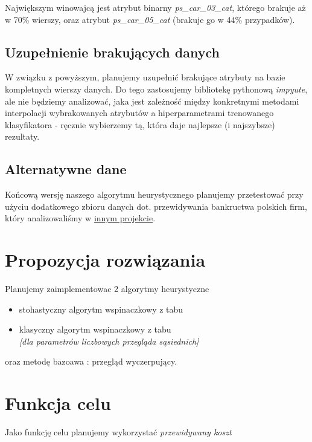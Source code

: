 \documentclass[11pt]{article}
\begin{document}
Największym winowajcą jest atrybut binarny \textsl{ps\_car\_03\_cat}, którego brakuje aż w 70\% wierszy, oraz atrybut \textsl{ps\_car\_05\_cat} (brakuje go w 44\% przypadków).

\subsection{Uzupełnienie brakujących danych}
W związku z powyższym, planujemy uzupełnić brakujące atrybuty na bazie kompletnych wierszy danych. Do tego zastosujemy bibliotekę pythonową \textsl{impyute}, ale nie będziemy analizować, jaka jest zależność między konkretnymi metodami interpolacji wybrakowanych atrybutów a hiperparametrami trenowanego klasyfikatora - ręcznie wybierzemy tą, która daje najlepsze (i najszybsze) rezultaty.

\subsection{Alternatywne dane}
Końcową wersję naszego algorytmu heurystycznego planujemy przetestować przy użyciu dodatkowego zbioru danych dot. przewidywania bankructwa polskich firm, który analizowaliśmy w \href{https://github.com/przestaw/Data_Mining_Bancrupcy}{innym projekcie}.


\section{Propozycja rozwiązania}
Planujemy zaimplementowac 2 algorytmy heurystyczne 
\begin{itemize}
	\item stohastyczny algorytm wspinaczkowy z tabu
	\item klasyczny algorytm wspinaczkowy z tabu \\
		\textsl{[dla parametrów liczbowych przegląda sąsiednich]}
\end{itemize}
oraz metodę bazoawa : przegląd wyczerpujący.

\section{Funkcja celu}
Jako funkcję celu planujemy wykorzystać \textsl{przewidywany koszt}
\end{document}
